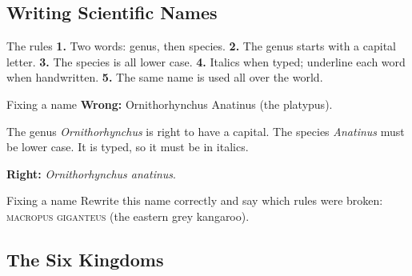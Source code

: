 \rcreset
{}

\label{theory:3}

\subsection{Writing Scientific Names}\label{sub:3.1}

\begin{skillbox}{The rules}
\textbf{1.} Two words: genus, then species. \quad \textbf{2.} The genus starts with a capital letter. \quad \textbf{3.} The species is all lower case. \quad \textbf{4.} Italics when typed; underline each word when handwritten. \quad \textbf{5.} The same name is used all over the world.
\end{skillbox}

\begin{workedex}{Fixing a name}
\textbf{Wrong:} Ornithorhynchus Anatinus (the platypus).

\smallskip
The genus \emph{Ornithorhynchus} is right to have a capital. The species \emph{Anatinus} must be lower case. It is typed, so it must be in italics.

\smallskip
\textbf{Right:} \textit{Ornithorhynchus anatinus}.
\end{workedex}

\begin{wedo}{Fixing a name}
Rewrite this name correctly and say which rules were broken: \textsc{macropus giganteus} (the eastern grey kangaroo).
\answerbox{4cm}
\end{wedo}

\subsection{The Six Kingdoms}\label{sub:3.2}

